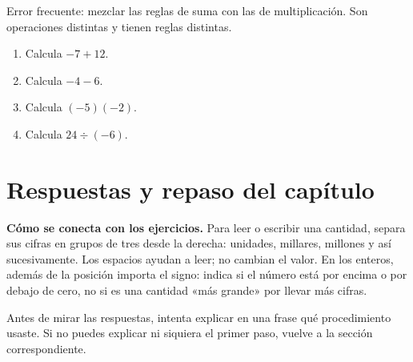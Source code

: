 \documentclass[10pt,oneside,openany]{book}
\begin{document}
\begin{ojo}
Error frecuente: mezclar las reglas de suma con las de multiplicación. Son operaciones distintas y tienen reglas distintas.
\end{ojo}

\begin{practica}

\begin{enumerate}

\item Calcula $-7+12$.

\item Calcula $-4-6$.

\item Calcula $(-5)(-2)$.

\item Calcula $24\div(-6)$.

\end{enumerate}

\end{practica}



\section{Respuestas y repaso del capítulo}

\textbf{Cómo se conecta con los ejercicios.} Para leer o escribir una cantidad, separa sus cifras en grupos de tres desde la derecha: unidades, millares, millones y así sucesivamente. Los espacios ayudan a leer; no cambian el valor. En los enteros, además de la posición importa el signo: indica si el número está por encima o por debajo de cero, no si es una cantidad «más grande» por llevar más cifras.

Antes de mirar las respuestas, intenta explicar en una frase qué procedimiento usaste. Si no puedes explicar ni siquiera el primer paso, vuelve a la sección correspondiente.
\end{document}
